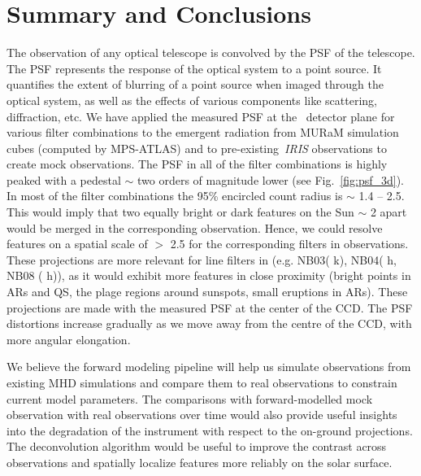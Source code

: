 \section{Summary and Conclusions}\label{sec:con}

The observation of any optical telescope is convolved by the PSF of the telescope. The PSF represents the response of the optical system to a point source. It quantifies the extent of blurring of a point source when imaged through the optical system, as well as the effects of various components like scattering, diffraction, etc. We have applied the measured PSF at the \suit\ detector plane for various filter combinations to the emergent radiation from MURaM simulation cubes (computed by MPS-ATLAS) and to pre-existing~{\it IRIS} observations to create mock {\suit} observations. The {\suit} PSF in all of the filter combinations is highly peaked with a pedestal $\sim$ two orders of magnitude lower (see Fig.~\ref{fig:psf_3d}). In most of the filter combinations the 95\% encircled count radius is $\sim$ 1.4 {--} 2.5{\arcsec}. This would imply that two equally bright or dark features on the Sun $\sim$ 2{\arcsec} apart would be merged in the corresponding {\suit} observation. Hence, we could resolve features on a spatial scale of $>$ 2.5{\arcsec} for the corresponding filters in {\suit} observations. These projections are more relevant for line filters in {\suit} (e.g. NB03( k), NB04( h, NB08 ( h)), as it would exhibit more features in close proximity (bright points in ARs and QS, the plage regions around sunspots, small eruptions in ARs). These projections are made with the measured PSF at the center of the CCD. The PSF distortions increase gradually as we move away from the centre of the CCD, with more angular elongation. 

We believe the forward modeling pipeline will help us simulate {\suit} observations from existing MHD simulations and compare them to real {\suit} observations to constrain current model parameters. The comparisons with forward-modelled mock {\suit} observation with real {\suit} observations over time would also provide useful insights into the degradation of the instrument with respect to the on-ground projections. The deconvolution algorithm would be useful to improve the contrast across {\suit} observations and spatially localize features more reliably on the solar surface.